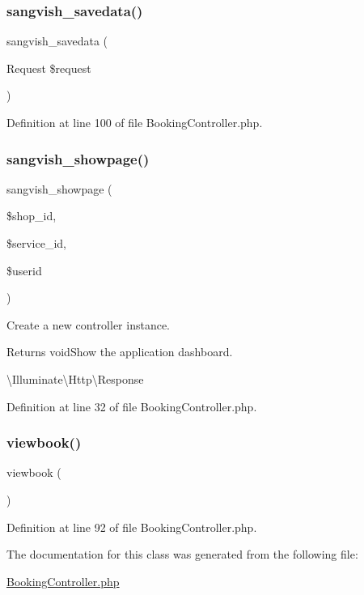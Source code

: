 \subsubsection{\texorpdfstring{sangvish\_savedata()}{sangvish\_savedata()}}
{\footnotesize\ttfamily sangvish\+\_\+savedata (\begin{DoxyParamCaption}\item[{Request}]{\$request }\end{DoxyParamCaption})}



Definition at line 100 of file Booking\+Controller.\+php.

\mbox{\label{class_responsive_1_1_http_1_1_controllers_1_1_booking_controller_ac4dbdfcb87b946eef72ff67ba43d73aa}} 
\subsubsection{\texorpdfstring{sangvish\_showpage()}{sangvish\_showpage()}}
{\footnotesize\ttfamily sangvish\+\_\+showpage (\begin{DoxyParamCaption}\item[{}]{\$shop\+\_\+id,  }\item[{}]{\$service\+\_\+id,  }\item[{}]{\$userid }\end{DoxyParamCaption})}

Create a new controller instance.

\begin{DoxyReturn}{Returns}
void\+Show the application dashboard.

\textbackslash{}\+Illuminate\textbackslash{}\+Http\textbackslash{}\+Response 
\end{DoxyReturn}


Definition at line 32 of file Booking\+Controller.\+php.

\mbox{\label{class_responsive_1_1_http_1_1_controllers_1_1_booking_controller_a2086730473ed696bdcb41452a2c575e0}} 
\subsubsection{\texorpdfstring{viewbook()}{viewbook()}}
{\footnotesize\ttfamily viewbook (\begin{DoxyParamCaption}{ }\end{DoxyParamCaption})}



Definition at line 92 of file Booking\+Controller.\+php.



The documentation for this class was generated from the following file\+:\begin{DoxyCompactItemize}
\item 
\mbox{\hyperlink{_booking_controller_8php}{Booking\+Controller.\+php}}\end{DoxyCompactItemize}
